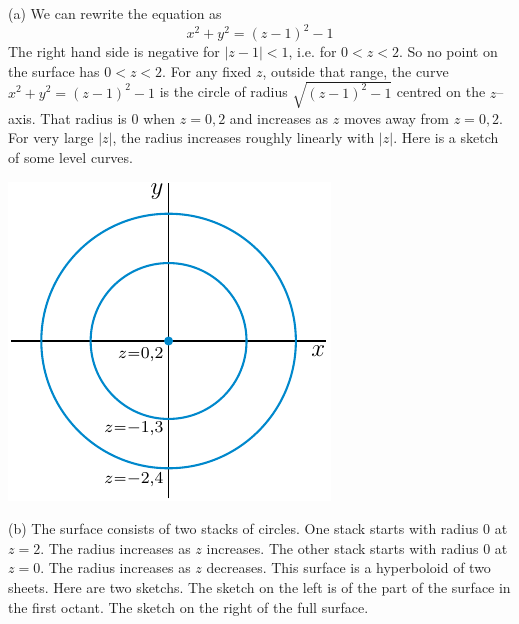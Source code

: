 \begin{solution} (a)
We can rewrite the equation as 
\begin{equation*}
x^2 + y^2 = (z-1)^2 - 1
\end{equation*}
The right hand side is negative for $|z-1|<1$, i.e. for $0<z<2$.
So no point on the surface has $0<z<2$. For any 
fixed $z$, outside that range, the curve $x^2 + y^2 = (z-1)^2 - 1$ 
is the circle of radius $\sqrt{(z-1)^2 - 1}$ centred on the $z$--axis.
That radius is $0$ when $z=0,2$ and increases as $z$ moves away from 
$z=0,2$. For very large $|z|$, the radius increases roughly linearly with
$|z|$. Here is a sketch of some level curves.

\begin{center}
     \includegraphics{fig/OE253_11D_1a.pdf}
\end{center}

(b)
The surface consists of two stacks of circles. 
One stack starts with radius $0$ at $z=2$. 
The radius increases as $z$ increases.
The other stack starts with radius $0$ at $z=0$. 
The radius increases as $z$ decreases.
This surface is a hyperboloid of two sheets. Here are two
sketchs. The sketch on the left is of the part of the surface in the
first octant. The sketch on the right of the full surface.


\end{solution}
